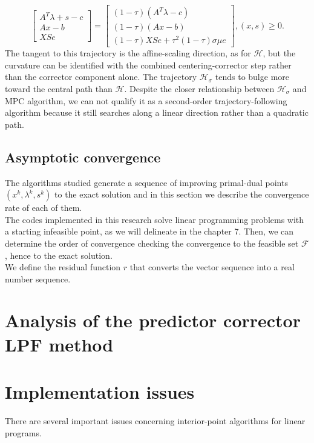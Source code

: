 \documentclass[a4paper,10 pt,titlepage,twoside]{book}
\theoremstyle{plain}
\theoremstyle{definition}
\theoremstyle{remark}
\begin{document}
\begin{equation}\label{T}
\begin{bmatrix}
A^{T}\lambda+s-c \\Ax-b \\XSe
\end{bmatrix}=\begin{bmatrix}
(1-\tau)(A^{T}\lambda-c)\\(1-\tau)(Ax-b)\\(1-\tau)XSe+\tau^{2}(1-\tau)\sigma\mu e
\end{bmatrix},(x,s)\geq0.
\end{equation}
The tangent to this trajectory is the affine-scaling direction, as for $\mathcal{H}$, but the curvature can be identified with the combined centering-corrector step rather than the corrector component alone. The trajectory $\mathcal{H}_{\sigma}$ tends to bulge more toward the central path than $\mathcal{H}$. Despite the closer relationship between $\mathcal{H}_{\sigma}$  and MPC algorithm, we can not qualify it as a second-order trajectory-following algorithm because it still searches along a linear direction rather than a quadratic path.  
\section{Asymptotic convergence}
The algorithms studied generate a sequence of improving primal-dual points $(x^{k},\lambda^{k}, s^{k})$ to the exact solution and in this section we describe the convergence rate of each of them. \\
The codes implemented in this research solve linear programming problems with a starting infeasible point, as we will delineate in the chapter 7. Then, we can determine the order of convergence checking the convergence to the feasible set $\mathcal{F}$, hence to the exact solution.\\
We define the residual function $r$ that converts the vector sequence into a real number sequence.
\chapter{Analysis of the predictor corrector LPF method}


\chapter{Implementation issues}
There are several important issues concerning interior-point algorithms
for linear programs.\\
\end{document}
